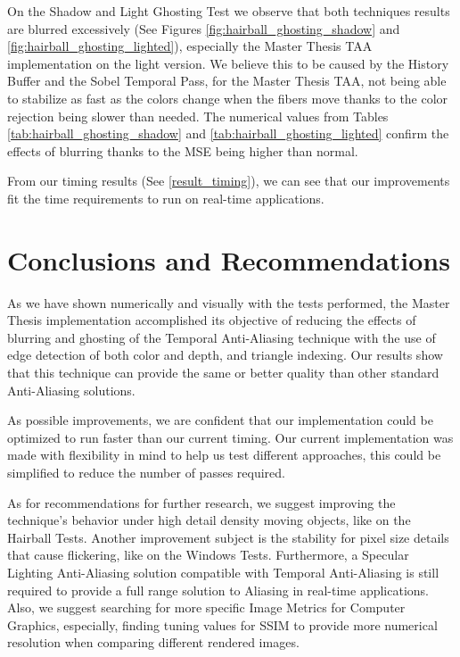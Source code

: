 \documentclass{cslthse-msc}
\begin{document}
On the Shadow and Light Ghosting Test we observe that both techniques results are blurred excessively (See Figures \ref{fig:hairball_ghosting_shadow} and \ref{fig:hairball_ghosting_lighted}), especially the Master Thesis TAA implementation on the light version. We believe this to be caused by the History Buffer and the Sobel Temporal Pass, for the Master Thesis TAA, not being able to stabilize as fast as the colors change when the fibers move thanks to the color rejection being slower than needed. The numerical values from Tables \ref{tab:hairball_ghosting_shadow} and \ref{tab:hairball_ghosting_lighted} confirm the effects of blurring thanks to the MSE being higher than normal.


From our timing results (See \ref{result_timing}), we can see that our improvements fit the time requirements to run on real-time applications.


\chapter{Conclusions and Recommendations}
As we have shown numerically and visually with the tests performed, the Master Thesis implementation accomplished its objective of reducing the effects of blurring and ghosting of the Temporal Anti-Aliasing technique with the use of edge detection of both color and depth, and triangle indexing. Our results show that this technique can provide the same or better quality than other standard Anti-Aliasing solutions. 

As possible improvements, we are confident that our implementation could be optimized to run faster than our current timing. Our current implementation was made with flexibility in mind to help us test different approaches, this could be simplified to reduce the number of passes required. 

As for recommendations for further research, we suggest improving the technique's behavior under high detail density moving objects, like on the Hairball Tests. Another improvement subject is the stability for pixel size details that cause flickering, like on the Windows Tests. Furthermore, a Specular Lighting Anti-Aliasing solution compatible with Temporal Anti-Aliasing is still required to provide a full range solution to Aliasing in real-time applications. Also, we suggest searching for more specific Image Metrics for Computer Graphics, especially, finding tuning values for SSIM to provide more numerical resolution when comparing different rendered images.
\end{document}
